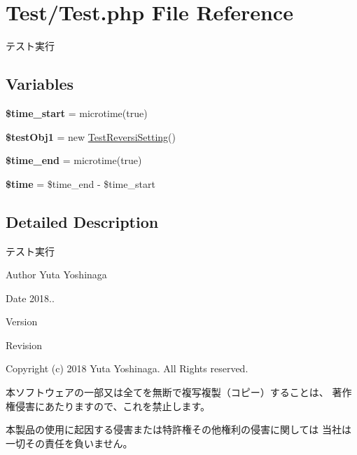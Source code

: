 \hypertarget{_test_8php}{}\section{Test/\+Test.php File Reference}
\label{_test_8php}


テスト実行  


\subsection*{Variables}
\begin{DoxyCompactItemize}
\item 
{\bfseries \$time\+\_\+start} = microtime(true)\hypertarget{_test_8php_a44d4a5ef593dd745482e1f2adb2f7774}{}\label{_test_8php_a44d4a5ef593dd745482e1f2adb2f7774}

\item 
{\bfseries \$test\+Obj1} = new \hyperlink{class_test_reversi_setting}{Test\+Reversi\+Setting}()\hypertarget{_test_8php_aa0e0c4380b3ca4652ca454f0eacc8e52}{}\label{_test_8php_aa0e0c4380b3ca4652ca454f0eacc8e52}

\item 
{\bfseries \$time\+\_\+end} = microtime(true)\hypertarget{_test_8php_a77f9b5c7480ad8fa3231d311d4b6feb3}{}\label{_test_8php_a77f9b5c7480ad8fa3231d311d4b6feb3}

\item 
{\bfseries \$time} = \$time\+\_\+end -\/ \$time\+\_\+start\hypertarget{_test_8php_a78db1a0602e3b6ac1d9a1b5ec103c160}{}\label{_test_8php_a78db1a0602e3b6ac1d9a1b5ec103c160}

\end{DoxyCompactItemize}


\subsection{Detailed Description}
テスト実行 

\begin{DoxyAuthor}{Author}
Yuta Yoshinaga 
\end{DoxyAuthor}
\begin{DoxyDate}{Date}
2018.. 
\end{DoxyDate}
\begin{DoxyParagraph}{Version}

\end{DoxyParagraph}
\begin{DoxyParagraph}{Revision}

\end{DoxyParagraph}


Copyright (c) 2018 Yuta Yoshinaga. All Rights reserved.


\begin{DoxyItemize}
\item 本ソフトウェアの一部又は全てを無断で複写複製（コピー）することは、 著作権侵害にあたりますので、これを禁止します。
\item 本製品の使用に起因する侵害または特許権その他権利の侵害に関しては 当社は一切その責任を負いません。 
\end{DoxyItemize}